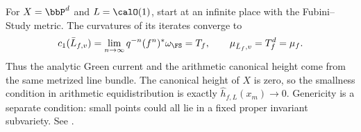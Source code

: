 \begin{remark}[label=\labelNFM{rmk:canonical-metric-and-green-current}, status=draft, tag=0000000]
	\leavevmode\par
	\begin{latexmathchange}
	For $X = \bbP^d$ and $L = \calO(1)$, start at an infinite place with the Fubini--Study metric.
	The curvatures of its iterates converge to
	\[ c_1(\bar L_{f,v}) = \lim_{n \to \infty}q^{-n}(f^n)^*\omega_\FS = T_f, \qquad \mu_{\bar L_f,v} = T_f^d = \mu_f. \]
	Thus the analytic Green current and the arithmetic canonical height come from the same metrized line bundle.
	The canonical height of $X$ is zero, so the smallness condition in arithmetic equidistribution is exactly $\widehat h_{f,L}(x_m) \to 0$.
	Genericity is a separate condition: small points could all lie in a fixed proper invariant subvariety.
	See \cite[Appendix~A.6.4]{Yuan-Zhang-2026-AdelicLineBundles}.
	\end{latexmathchange}
\end{remark}





